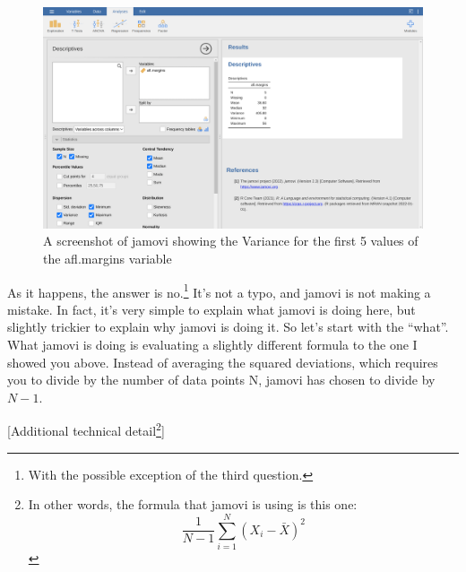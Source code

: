 \documentclass[
  a4paper,
]{book}
\begin{document}
\begin{figure}

\includegraphics[width=1\textwidth,height=\textheight]{images/fig4-9.png} \hfill{}

\caption{\label{fig-fig4-9}A screenshot of jamovi showing the Variance
for the first 5 values of the afl.margins variable}

\end{figure}

As it happens, the answer is no.\footnote{With the possible exception of
  the third question.} It's not a typo, and jamovi is not making a
mistake. In fact, it's very simple to explain what jamovi is doing here,
but slightly trickier to explain why jamovi is doing it. So let's start
with the ``what''. What jamovi is doing is evaluating a slightly
different formula to the one I showed you above. Instead of averaging
the squared deviations, which requires you to divide by the number of
data points N, jamovi has chosen to divide by \(N - 1\).

{[}Additional technical detail\footnote{In other words, the formula that
  jamovi is using is this one:
  \[\frac{1}{N-1} \sum_{i=1}^{N} ( X_i - \bar{X} )^2\]}{]}
\end{document}
